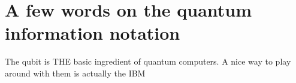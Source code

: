 \section{A few words on the quantum information notation}

The qubit is THE basic ingredient of quantum computers. A nice way to play around with them is actually the IBM